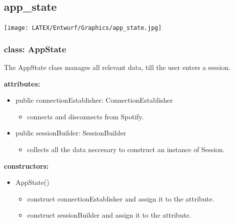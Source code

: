 \documentclass[oneside, ngerman]{sdqtechreport}
\begin{document}
\subsection{app\_state}


\texttt{[image: LATEX/Entwurf/Graphics/app\_state.jpg]}

\subsubsection{class: AppState}
The AppState class manages all relevant data, till the user enters a session.

\textbf{attributes:}
\begin{itemize}
    \item public connectionEstablisher: ConnectionEstablisher
    \begin{itemize}
        \item connects and disconnects from Spotify.
    \end{itemize}
    \item public sessionBuilder: SessionBuilder
    \begin{itemize}
        \item collects all the data neccesary to construct an instance of Session.
    \end{itemize}
\end{itemize}

\textbf{constructors:}
\begin{itemize}
    \item AppState()
    \begin{itemize}
        \item construct connectionEstablisher and assign it to the attribute.
        \item construct sessionBuilder and assign it to the attribute.
    \end{itemize}
    
\end{itemize}
\end{document}
